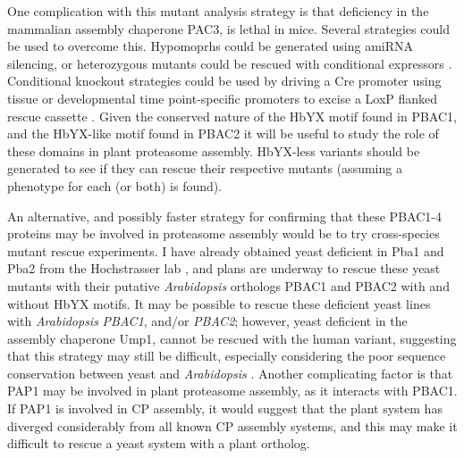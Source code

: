 	One complication with this mutant analysis strategy is that deficiency in the mammalian assembly chaperone PAC3, is lethal in mice.  Several strategies could be used to overcome this. Hypomoprhs could be generated using amiRNA silencing, or heterozygous mutants could be rescued with conditional expressors \citep{eamens14}. Conditional knockout strategies could be used by driving a Cre promoter using tissue or developmental time point-specific promoters to excise a LoxP flanked rescue cassette \citep{louwerse07}.  Given the conserved nature of the HbYX motif found in PBAC1, and the HbYX-like motif found in PBAC2 it will be useful to study the role of these domains in plant proteasome assembly. HbYX-less variants should be generated to see if they can rescue their respective mutants (assuming a phenotype for each (or both) is found).

	An alternative, and possibly faster strategy for confirming that these PBAC1-4 proteins may be involved in proteasome assembly would be to try cross-species mutant rescue experiments. I have already obtained yeast deficient in Pba1 and Pba2 from the Hochstrasser lab \citep{kusmierczyk11}, and plans are underway to rescue these yeast mutants with their putative \textit{Arabidopsis} orthologs PBAC1 and PBAC2 with and without HbYX motifs. It may be possible to rescue these deficient yeast lines with \textit{Arabidopsis} \textit{PBAC1}, and/or \textit{PBAC2}; however, yeast deficient in the assembly chaperone Ump1, cannot be rescued with the human variant, suggesting that this strategy may still be difficult, especially considering the poor sequence conservation between yeast and \textit{Arabidopsis} \citep{burri00}.  Another complicating factor is that PAP1 may be involved in plant proteasome assembly, as it interacts with PBAC1.  If PAP1 is involved in CP assembly, it would suggest that the plant system has diverged considerably from all known CP assembly systems, and this may make it difficult to rescue a yeast system with a plant ortholog. 
	
